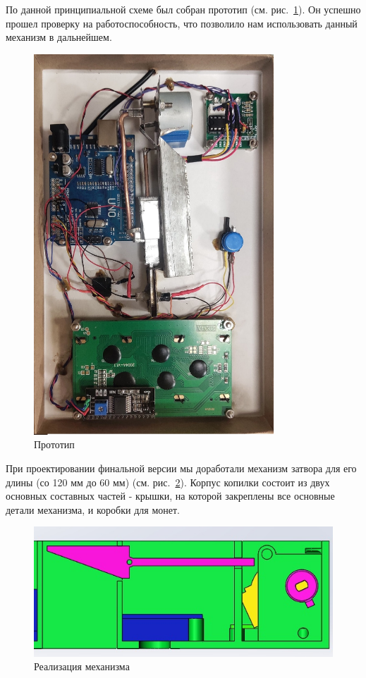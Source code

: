 По данной принципиальной схеме был собран прототип (см. рис.~\ref{ris:proto}). Он успешно прошел проверку на работоспособность, что позволило нам использовать данный механизм в дальнейшем.

\begin{figure}[H]
	\centering
	\includegraphics[width=9cm]{pics/proto.jpg}
	\caption{Прототип}
	\label{ris:proto}
\end{figure}
\par\medskip

При проектировании финальной версии мы доработали механизм затвора для его длины (со 120 мм до 60 мм) (см. рис.~\ref{ris:mechan}). Корпус копилки состоит из двух основных составных частей - крышки, на которой закреплены все основные детали механизма, и коробки для монет. 

\begin{figure}[H]
	\centering
	\includegraphics[width=12cm]{pics/mechan.jpg}
	\caption{Реализация механизма}
	\label{ris:mechan}
\end{figure}
\par\medskip

